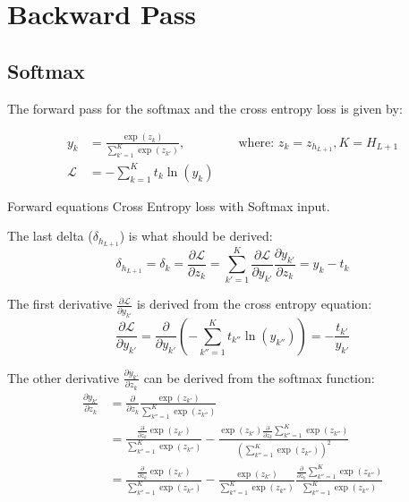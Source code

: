 \chapter{Backward Pass}

\section{Softmax}
\label{appendix:backward-pass:softmax}

The forward pass for the softmax and the cross entropy loss is given by:

\begin{equationbox}[H]
\begin{equation*}
\begin{aligned}
y_k &= \frac{\exp(z_k)}{\sum_{k'=1}^K \exp(z_{k'})}, && \text{ where: } z_k=z_{h_{L+1}}, K = H_{L + 1} \\
\mathcal{L} &= - \sum_{k=1}^K t_k \ln(y_k)
\end{aligned}
\end{equation*}
\caption{Forward equations Cross Entropy loss with Softmax input.}
\end{equationbox}

The last delta ($\delta_{h_{L+1}}$) is what should be derived:
\begin{equation}
\delta_{h_{L + 1}} = \delta_k = \frac{\partial \mathcal{L}}{\partial z_k} = \sum_{k'=1}^K \frac{\partial \mathcal{L}}{\partial y_{k'}} \frac{\partial y_{k'}}{\partial z_k} = y_k - t_k
\label{appendix:backprop:softmax:bprop-delta-last}
\end{equation}

The first derivative $\frac{\partial \mathcal{L}}{\partial y_{k'}}$ is derived from the cross entropy equation:
\begin{equation}
\frac{\partial \mathcal{L}}{\partial y_{k'}} = \frac{\partial}{\partial y_{k'}} \left(- \sum_{k''=1}^K t_{k''} \ln(y_{k''})\right) = -\frac{t_{k'}}{y_{k'}}
\label{appendix:backprop:softmax:bprop-Ldy}
\end{equation}

The other derivative $\frac{\partial y_{k'}}{\partial z_k}$ can be derived from the softmax function:
\begin{equation}
\begin{aligned}
\frac{\partial y_{k'}}{\partial z_k}
&= \frac{\partial}{\partial z_k} \frac{\exp(z_{k'})}{\sum_{k''=1}^K \exp(z_{k''})} \\
&= \frac{\frac{\partial}{\partial z_k} \exp(z_{k'})}{\sum_{k''=1}^K \exp(z_{k''})}
- \frac{\exp(z_{k'}) \frac{\partial}{\partial z_k} \sum_{k''=1}^K \exp(z_{k''})}{\left(\sum_{k''=1}^K \exp(z_{k''})\right)^2} \\
&= \frac{\frac{\partial}{\partial z_k} \exp(z_{k'})}{\sum_{k''=1}^K \exp(z_{k''})}
- \frac{\exp(z_{k'})}{\sum_{k''=1}^K \exp(z_{k''})} \frac{\frac{\partial}{\partial z_k} \sum_{k''=1}^K \exp(z_{k''})}{\sum_{k''=1}^K \exp(z_{k''})}
\end{aligned}
\end{equation}

